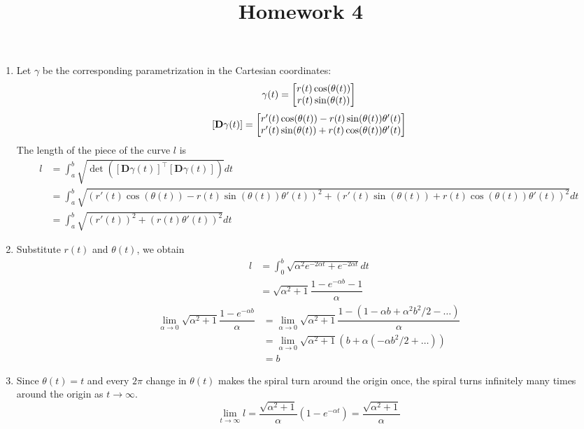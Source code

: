 \documentclass{homework}
\title{Homework 4}
\begin{document}
\maketitle

\begin{problem}{1}
\begin{enumerate}
\item
Let $\gamma$ be the corresponding parametrization in the Cartesian coordinates:
$$\gamma(t) = \begin{bmatrix}r(t)\cos(\theta(t))\\r(t)\sin(\theta(t))\end{bmatrix}$$
$$[\mathbf{D}\gamma(t)] = \begin{bmatrix}
r'(t)\cos(\theta(t))-r(t)\sin(\theta(t))\theta'(t)\\
r'(t)\sin(\theta(t))+r(t)\cos(\theta(t))\theta'(t)
\end{bmatrix}$$
The length of the piece of the curve $l$ is
\begin{align*}
l  &=
\int_a^b \sqrt{\det([\mathbf{D}\gamma(t)]^{\top}[\mathbf{D}\gamma(t)])}dt
\\ &=
\int_a^b \sqrt{
(r'(t)\cos(\theta(t))-r(t)\sin(\theta(t))\theta'(t))^2+
(r'(t)\sin(\theta(t))+r(t)\cos(\theta(t))\theta'(t))^2}dt
\\ &=
\int_a^b \sqrt{(r'(t))^2+(r(t)\theta'(t))^2}dt
\end{align*}

\item
Substitute $r(t)$ and $\theta(t)$, we obtain
\begin{align*}
l  &=
\int_0^b \sqrt{\alpha^2e^{-2\alpha t}+e^{-2\alpha t}} dt
\\ &=
\sqrt{\alpha^2+1}\dfrac{1-e^{-\alpha b}-1}{\alpha}
\end{align*}
\begin{align*}
\lim_{\alpha \to 0}
\sqrt{\alpha^2+1}\dfrac{1-e^{-\alpha b}}{\alpha}
&=
\lim_{\alpha \to 0}
\sqrt{\alpha^2+1}\dfrac{1-(1-\alpha b+\alpha^2b^2/2 - \hdots)}{\alpha} \\
&=
\lim_{\alpha \to 0}
\sqrt{\alpha^2+1}(b+\alpha(-\alpha b^2/2 + \hdots)) \\
&= b
\end{align*}

\item
Since $\theta(t) = t$ and every $2\pi$ change in $\theta(t)$ makes the spiral
turn around the origin once, the spiral turns infinitely many times around the
origin as $t \to \infty$.
$$\lim_{t \to \infty}l = \dfrac{\sqrt{\alpha^2+1}}{\alpha}(1-e^{-\alpha t})
= \dfrac{\sqrt{\alpha^2+1}}{\alpha}$$
\end{enumerate}
\end{problem}
\end{document}
